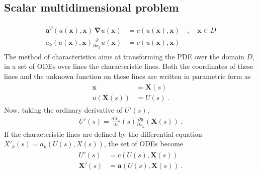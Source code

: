 \documentclass[letterpaper,10pt,english]{jupyterBook}
\begin{document}
\subsection{Scalar multi\sphinxhyphen{}dimensional problem}
\label{\detokenize{ch/pde/characteristics:scalar-multi-dimensional-problem}}\begin{equation*}
\begin{split}\begin{aligned}
  \mathbf{a}^T(u(\mathbf{x}), \mathbf{x}) \, \boldsymbol\nabla  u(\mathbf{x}) & = c(u(\mathbf{x}), \mathbf{x}) \quad , \quad \mathbf{x} \in D \\
  a_k(u(\mathbf{x}), \mathbf{x}) \frac{\partial}{\partial x_k} u(\mathbf{x}) & = c(u(\mathbf{x}), \mathbf{x}) 
\end{aligned}\end{split}
\end{equation*}
\sphinxAtStartPar
The method of characteristics aims at transforming the PDE over the domain \(D\), in a set of ODEs over lines \sphinxhyphen{} the characteristic lines. Both the coordinates of these lines and the unknown function on these lines are written in parametric form as
\begin{equation*}
\begin{split}\begin{aligned}
  \mathbf{x} & = \mathbf{X}(s) \\
  u(\mathbf{X}(s)) & = U(s) \ .
\end{aligned}\end{split}
\end{equation*}
\sphinxAtStartPar
Now, taking the ordinary derivative of \(U'(s)\),
\begin{equation*}
\begin{split}U'(s) = \frac{d X_k}{d s}(s) \frac{\partial u}{\partial x_k}\left( \mathbf{X}(s) \right) \ .\end{split}
\end{equation*}
\sphinxAtStartPar
If the characteristic lines are defined by the differential equation \(X'_k(s) = a_k(U(s), X(s))\), the set of ODEs become
\begin{equation*}
\begin{split}\begin{aligned}
 U'(s) & = c\left(U(s), \mathbf{X}(s)\right) \\
 \mathbf{X}'(s) & = \mathbf{a}\left(U(s), \mathbf{X}(s)\right) \ .
\end{aligned}\end{split}
\end{equation*}
\end{document}
